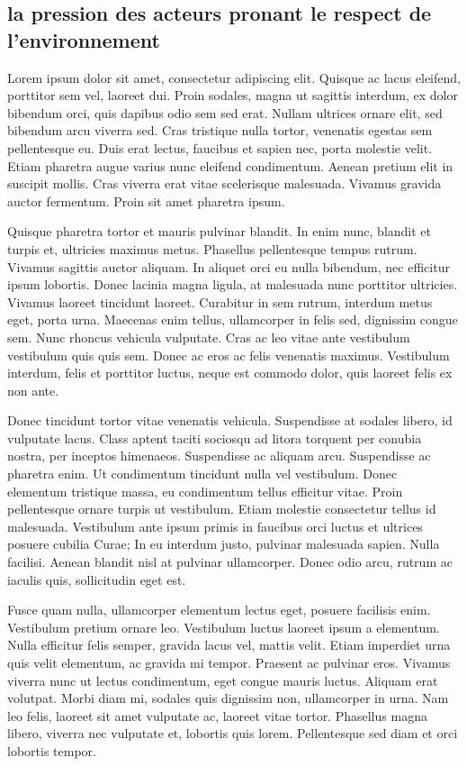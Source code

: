 \subsection{la pression des acteurs pronant le respect de l’environnement }



Lorem ipsum dolor sit amet, consectetur adipiscing elit. Quisque ac lacus eleifend, porttitor sem vel, laoreet dui. Proin sodales, magna ut sagittis interdum, ex dolor bibendum orci, quis dapibus odio sem sed erat. Nullam ultrices ornare elit, sed bibendum arcu viverra sed. Cras tristique nulla tortor, venenatis egestas sem pellentesque eu. Duis erat lectus, faucibus et sapien nec, porta molestie velit. Etiam pharetra augue varius nunc eleifend condimentum. Aenean pretium elit in suscipit mollis. Cras viverra erat vitae scelerisque malesuada. Vivamus gravida auctor fermentum. Proin sit amet pharetra ipsum.

Quisque pharetra tortor et mauris pulvinar blandit. In enim nunc, blandit et turpis et, ultricies maximus metus. Phasellus pellentesque tempus rutrum. Vivamus sagittis auctor aliquam. In aliquet orci eu nulla bibendum, nec efficitur ipsum lobortis. Donec lacinia magna ligula, at malesuada nunc porttitor ultricies. Vivamus laoreet tincidunt laoreet. Curabitur in sem rutrum, interdum metus eget, porta urna. Maecenas enim tellus, ullamcorper in felis sed, dignissim congue sem. Nunc rhoncus vehicula vulputate. Cras ac leo vitae ante vestibulum vestibulum quis quis sem. Donec ac eros ac felis venenatis maximus. Vestibulum interdum, felis et porttitor luctus, neque est commodo dolor, quis laoreet felis ex non ante.

Donec tincidunt tortor vitae venenatis vehicula. Suspendisse at sodales libero, id vulputate lacus. Class aptent taciti sociosqu ad litora torquent per conubia nostra, per inceptos himenaeos. Suspendisse ac aliquam arcu. Suspendisse ac pharetra enim. Ut condimentum tincidunt nulla vel vestibulum. Donec elementum tristique massa, eu condimentum tellus efficitur vitae. Proin pellentesque ornare turpis ut vestibulum. Etiam molestie consectetur tellus id malesuada. Vestibulum ante ipsum primis in faucibus orci luctus et ultrices posuere cubilia Curae; In eu interdum justo, pulvinar malesuada sapien. Nulla facilisi. Aenean blandit nisl at pulvinar ullamcorper. Donec odio arcu, rutrum ac iaculis quis, sollicitudin eget est.

Fusce quam nulla, ullamcorper elementum lectus eget, posuere facilisis enim. Vestibulum pretium ornare leo. Vestibulum luctus laoreet ipsum a elementum. Nulla efficitur felis semper, gravida lacus vel, mattis velit. Etiam imperdiet urna quis velit elementum, ac gravida mi tempor. Praesent ac pulvinar eros. Vivamus viverra nunc ut lectus condimentum, eget congue mauris luctus. Aliquam erat volutpat. Morbi diam mi, sodales quis dignissim non, ullamcorper in urna. Nam leo felis, laoreet sit amet vulputate ac, laoreet vitae tortor. Phasellus magna libero, viverra nec vulputate et, lobortis quis lorem. Pellentesque sed diam et orci lobortis tempor.


